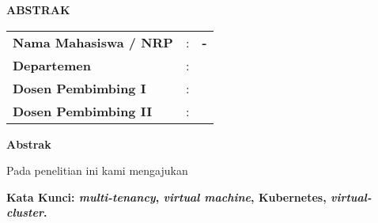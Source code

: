 \begin{center}
  \large\textbf{ABSTRAK}
\end{center}


\vspace{2ex}

\begin{center}
  \large\textbf{\tatitle{}}
\end{center}

\vspace{2ex}

\begingroup
\setlength{\tabcolsep}{0pt}

\noindent
\begin{tabularx}{\textwidth}{l >{\centering}m{2em} X}
  \textbf{Nama Mahasiswa / NRP} & : & \textbf{\name{} - \nrp{}} \\
  \textbf{Departemen}           & : & \textbf{\department{}}    \\
  \textbf{Dosen Pembimbing I}   & : & \textbf{\advisor{}}       \\
  \textbf{Dosen Pembimbing II}  & : & \textbf{\coadvisor{}}     \\
\end{tabularx}
\endgroup

\noindent
\textbf{Abstrak}

Pada penelitian ini kami mengajukan \lipsum[1]

\vspace{2ex}
\noindent
\textbf{Kata Kunci: \emph{multi-tenancy}, \emph{virtual machine}, Kubernetes, \emph{virtual-cluster}.}
